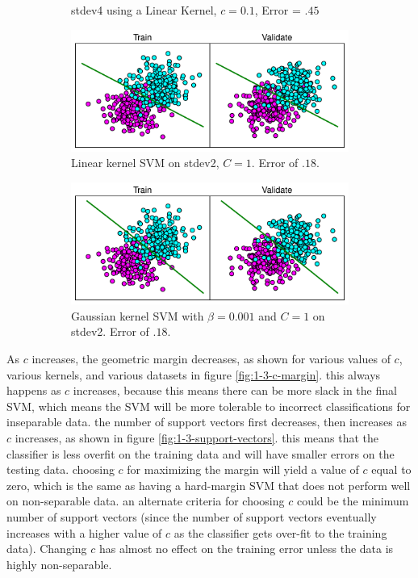 \documentclass[10pt]{article}
\begin{document}
\begin{figure}[!ht]
\begin{subfigure}[t]{0.46\textwidth}
	\caption{stdev4 using a Linear Kernel, $c = 0.1$, Error = $.45$}
	\label{fig:1-3-4}
\end{subfigure}
\caption{}
\label{fig:1-3-all2}
\end{figure}

\begin{figure}[!ht]
\begin{subfigure}[t]{0.46\textwidth}
	\centering
	\includegraphics[width=.8\textwidth]{1-3-stdev2-1-linear-REAL.pdf}
	\caption{Linear kernel SVM on stdev2, $C = 1$. Error of $.18$.}
	\label{fig:1-3-linear-linear}
\end{subfigure}
\begin{subfigure}[t]{0.46\textwidth}
	\centering
	\includegraphics[width=.8\textwidth]{1-3-stdev2-1-0_001-gaussian-REAL.pdf}
	\caption{Gaussian kernel SVM with $\beta = 0.001$ and $C = 1$ on stdev2. Error of $.18$.}
	\label{fig:1-3-gaussian-linear}
\end{subfigure}
\caption{}
\label{fig:1-3-all3}
\end{figure}

As $c$ increases, the geometric margin decreases, as shown for various values of $c$, various kernels, and various datasets in figure \ref{fig:1-3-c-margin}. this always happens as $c$ increases, because this means there can be more slack in the final SVM, which means the SVM will be more tolerable to incorrect classifications for inseparable data. the number of support vectors first decreases, then increases as $c$ increases, as shown in figure \ref{fig:1-3-support-vectors}. this means that the classifier is less overfit on the training data and will have smaller errors on the testing data. choosing $c$ for maximizing the margin will yield a value of $c$ equal to zero, which is the same as having a hard-margin SVM that does not perform well on non-separable data. an alternate criteria for choosing $c$ could be the minimum number of support vectors (since the number of support vectors eventually increases with a higher value of $c$ as the classifier gets over-fit to the training data). Changing $c$ has almost no effect on the training error unless the data is highly non-separable.
\end{document}
